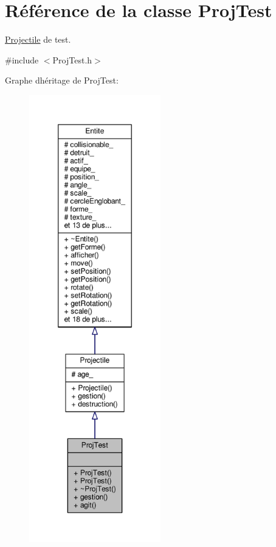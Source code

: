 \hypertarget{class_proj_test}{}\section{Référence de la classe Proj\+Test}
\label{class_proj_test}


\hyperlink{class_projectile}{Projectile} de test.  




{\ttfamily \#include $<$Proj\+Test.\+h$>$}



Graphe d\textquotesingle{}héritage de Proj\+Test\+:\nopagebreak
\begin{figure}[H]
\begin{center}
\leavevmode
\includegraphics[height=550pt]{class_proj_test__inherit__graph}
\end{center}
\end{figure}


